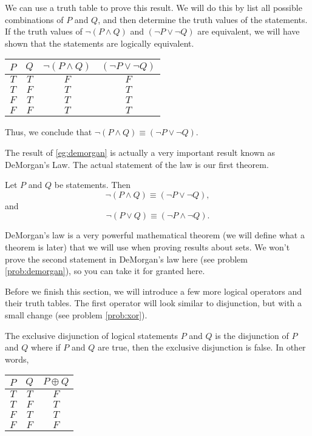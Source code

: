 \begin{example}{}\label{eg:demorgan}
	We can use a truth table to prove this result. We will do this by list all possible combinations of $P$ and $Q$, and then determine the truth values of the statements. If the truth values of $\neg(P \land Q)$ and $(\neg P \lor \neg Q)$ are equivalent, we will have shown that the statements are logically equivalent.
	\begin{center}
		\begin{tabular}{c | c | c | c}
			$P$ & $Q$ & $\neg(P \land Q)$ & $(\neg P \lor \neg Q)$ \\
			\hline
			$T$ & $T$ & $F$               & $F$                    \\
			$T$ & $F$ & $T$               & $T$                    \\
			$F$ & $T$ & $T$               & $T$                    \\
			$F$ & $F$ & $T$               & $T$
		\end{tabular}
	\end{center}
	Thus, we conclude that $\neg(P \land Q) \equiv (\neg P \lor \neg Q)$.
\end{example}

The result of \cref{eg:demorgan} is actually a very important result known as DeMorgan's Law. The actual statement of the law is our first theorem.

\begin{namedtheorem}\label{thm:demorgan}
	Let $P$ and $Q$ be statements. Then
	\[\neg(P \land Q) \equiv (\neg P \lor \neg Q),\] and
	\[\neg(P\lor Q)\equiv (\neg P \land \neg Q).\]
\end{namedtheorem}

DeMorgan's law is a very powerful mathematical theorem (we will define what a theorem is later) that we will use when proving results about sets. We won't prove the second statement in DeMorgan's law here (see problem \ref{prob:demorgan}), so you can take it for granted here.

Before we finish this section, we will introduce a few more logical operators and their truth tables. The first operator will look similar to disjunction, but with a small change (see problem \ref{prob:xor}).

\begin{definition}{}
	The exclusive disjunction of logical statements $P$ and $Q$ is the disjunction of $P$ and $Q$ where if $P$ and $Q$ are true, then the exclusive disjunction is false. In other words,
	\begin{center}
		\begin{tabular}{c | c | c}
			$P$ & $Q$ & $P\oplus Q$ \\
			\hline
			$T$ & $T$ & $F$         \\
			$T$ & $F$ & $T$         \\
			$F$ & $T$ & $T$         \\
			$F$ & $F$ & $F$
		\end{tabular}
	\end{center}
\end{definition}

